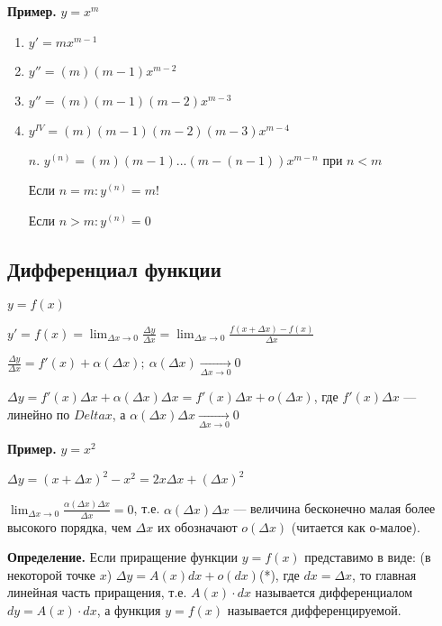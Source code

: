 \documentclass{article}
\begin{document}
    \textbf{Пример.} \( y = x^m \)

    \begin{enumerate}
        \item \( y' = mx^{m - 1} \)
        \item \( y'' = (m)(m - 1)x^{m - 2} \)
        \item \( y'' = (m)(m - 1)(m - 2)x^{m - 3} \)
        \item \( y^{IV} = (m)(m - 1)(m - 2)(m - 3)x^{m - 4} \)
        \item[\(n\).] \( y^{(n)} = (m)(m - 1)...(m - (n - 1))x^{m - n}\) при \(n < m\)
        
        Если \(n = m: y^{(n)} = m!\) 

        Если \(n > m: y^{(n)} = 0\)
    \end{enumerate}

    \subsection{Дифференциал функции}

    \( y = f(x) \)    

    \( y' = f(x) = \lim_{\Delta x \to 0}\frac{\Delta y}{\Delta x} = \lim_{\Delta x \to 0}\frac{f(x + \Delta x) - f(x)}{\Delta x} \)

    \( \frac{\Delta y}{\Delta x} = f'(x) + \alpha(\Delta x);\ \alpha(\Delta x) \xrightarrow[\Delta x \to 0]{} 0\)

    \( \Delta y = f'(x)\Delta x + \alpha(\Delta x)\Delta x = f'(x)\Delta x + o(\Delta x) \), где \(f'(x)\Delta x\) --- линейно по \(Delta x\), а \(\alpha(\Delta x)\Delta x \xrightarrow[\Delta x \to 0]{} 0\)

    \textbf{Пример.} \( y = x^2 \)

    \( \Delta y = (x + \Delta x)^2 - x^2 = 2x\Delta x + (\Delta x)^2 \)

    \( \lim_{\Delta x \to 0}\frac{\alpha(\Delta x)\Delta x}{\Delta x} = 0 \), т.е. \(\alpha(\Delta x)\Delta x\) --- величина бесконечно малая более высокого порядка, чем \(\Delta x\) их обозначают \(o(\Delta x)\) (читается как о-малое).

    \textbf{Определение.} Если приращение функции \( y = f(x) \) представимо в виде: (в некоторой точке \(x\)) \( \Delta y = A(x)dx + o(dx) \)(*), где \( dx = \Delta x \), то главная линейная часть приращения, т.е. \(A(x)\cdot dx\) называется дифференциалом \(dy = A(x)\cdot dx\), а функция \( y = f(x) \) называется дифференцируемой.
\end{document}
